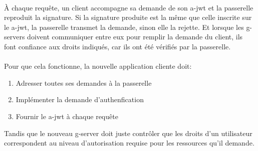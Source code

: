 \paragraph{}
À chaque requête, un client accompagne sa demande de son \gls{a-jwt} et la passerelle reproduit la signature.
Si la signature produite est la même que celle inscrite sur le \gls{a-jwt}, la passerelle transmet la demande, sinon elle la rejette.
Et lorsque les \glspl{g-server} doivent communiquer entre eux pour remplir la demande du client, ils font confiance aux droits indiqués, car ils ont été vérifiés par la passerelle.

\paragraph{}
Pour que cela fonctionne, la nouvelle application cliente doit:
\begin{enumerate}
    \item Adresser toutes ses demandes à la passerelle
    \item Implémenter la demande d'authenfication
    \item Fournir le \gls{a-jwt} à chaque requête
\end{enumerate}
Tandis que le nouveau \gls{g-server} doit juste contrôler que les droits d'un utilisateur correspondent au niveau d'autorisation requise pour les ressources qu'il demande.
